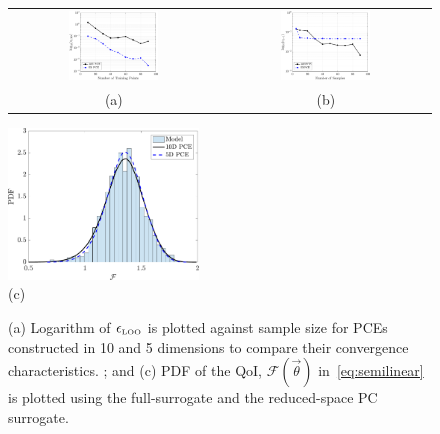 \begin{figure}[htbp]
 \begin{center}
 \begin{tabular}{cc}
  \includegraphics[width=0.45\textwidth]{./Figures/err_samples_elliptic}
  &
  \includegraphics[width=0.45\textwidth]{./Figures/errL2_samples_elliptic}
  \\ (a) & (b)
  \end{tabular}
  \includegraphics[width=0.45\textwidth]{./Figures/pdf_comp_elliptic}
  \\ (c)
\caption{(a) Logarithm of $\epsilon_{\mbox{\tiny{LOO}}}$ is plotted against sample 
size for PCEs constructed in 10 and 5 dimensions to compare their convergence 
characteristics. ; 
and (c) PDF of the QoI, $\mathcal{F}(\vec\theta)$ in~\eqref{eq:semilinear}
is plotted using the full-surrogate and the reduced-space PC surrogate.}
\label{fig:conv_elliptic}
\end{center}
\end{figure}
